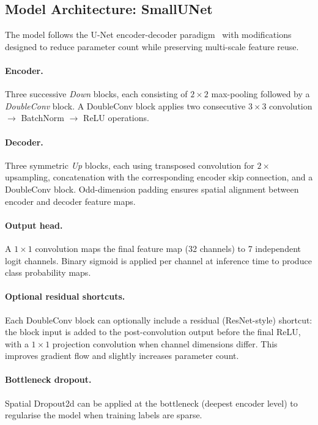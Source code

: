 \subsection{Model Architecture: SmallUNet}
\label{sec:mr_architecture}

The model follows the U-Net encoder-decoder paradigm~\cite{ronneberger2015unet} with modifications designed to reduce parameter count while preserving multi-scale feature reuse.

\paragraph{Encoder.}
Three successive \textit{Down} blocks, each consisting of $2\times 2$ max-pooling followed by a \textit{DoubleConv} block. A DoubleConv block applies two consecutive $3\times 3$ convolution $\to$ BatchNorm $\to$ ReLU operations.

\paragraph{Decoder.}
Three symmetric \textit{Up} blocks, each using transposed convolution for $2\times$ upsampling, concatenation with the corresponding encoder skip connection, and a DoubleConv block. Odd-dimension padding ensures spatial alignment between encoder and decoder feature maps.

\paragraph{Output head.}
A $1\times 1$ convolution maps the final feature map (32 channels) to 7 independent logit channels. Binary sigmoid is applied per channel at inference time to produce class probability maps.

\paragraph{Optional residual shortcuts.}
Each DoubleConv block can optionally include a residual (ResNet-style) shortcut: the block input is added to the post-convolution output before the final ReLU, with a $1\times 1$ projection convolution when channel dimensions differ. This improves gradient flow and slightly increases parameter count.

\paragraph{Bottleneck dropout.}
Spatial Dropout2d can be applied at the bottleneck (deepest encoder level) to regularise the model when training labels are sparse.

